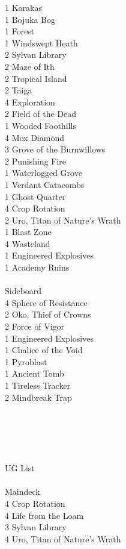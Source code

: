 \documentclass{report}
\begin{document}
1 Karakas\\
1 Bojuka Bog\\
1 Forest\\
1 Windswept Heath\\
2 Sylvan Library\\
2 Maze of Ith\\
2 Tropical Island\\
2 Taiga\\
4 Exploration\\
2 Field of the Dead\\
1 Wooded Foothills\\
4 Mox Diamond\\
3 Grove of the Burnwillows\\
2 Punishing Fire\\
1 Waterlogged Grove\\
1 Verdant Catacombs\\
1 Ghost Quarter\\
4 Crop Rotation\\
2 Uro, Titan of Nature's Wrath\\
1 Blast Zone\\
4 Wasteland\\
1 Engineered Explosives\\
1 Academy Ruins\\\\
Sideboard\\
4 Sphere of Resistance\\
2 Oko, Thief of Crowns\\
2 Force of Vigor\\
1 Engineered Explosives\\
1 Chalice of the Void\\
1 Pyroblast\\
1 Ancient Tomb\\
1 Tireless Tracker\\
2 Mindbreak Trap\\\\\\\\\\\\
UG List\\\\
Maindeck\\
4 Crop Rotation\\
4 Life from the Loam\\
3 Sylvan Library\\
4 Uro, Titan of Nature's Wrath\\
\end{document}
